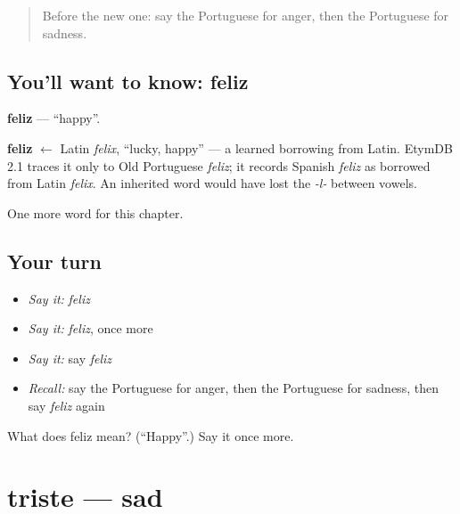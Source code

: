 \label{lesson:PT-C36-feliz}



\begin{quote}
Before the new one: say the Portuguese for anger, then the Portuguese for sadness.
\end{quote}

\subsection*{You'll want to know: feliz}
\textbf{feliz} — \textquotedblleft{}happy\textquotedblright{}.

\begin{cousinweb}
\textbf{feliz} $\leftarrow$ Latin \emph{felix}, \textquotedblleft{}lucky, happy\textquotedblright{} — a learned borrowing from Latin. EtymDB 2.1 traces it only to Old Portuguese \emph{feliz}; it records Spanish \emph{feliz} as borrowed from Latin \emph{felix}. An inherited word would have lost the \emph{-l-} between vowels.
\end{cousinweb}

\begin{grammarlens}[title={What you've built}]
One more word for this chapter.
\end{grammarlens}

\subsection*{Your turn}
\begin{itemize}
\raggedright
  \item \emph{Say it:} \emph{feliz}
  \item \emph{Say it:} \emph{feliz}, once more
  \item \emph{Say it:} say \emph{feliz}
  \item \emph{Recall:} say the Portuguese for anger, then the Portuguese for sadness, then say \emph{feliz} again
\end{itemize}

\begin{tcolorbox}[breakable,colback=teal!4,colframe=teal!35!black,title={Before you move on}]
What does feliz mean? (\textquotedblleft{}Happy\textquotedblright{}.) Say it once more.
\end{tcolorbox}
\section[triste]{triste — sad}

